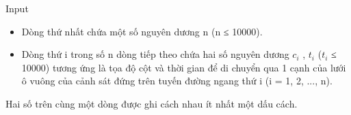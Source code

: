 Input
\begin{itemize}
	\item Dòng thứ nhất chứa một số nguyên dương n (n ≤ 10000).
	\item Dòng thứ i trong số n dòng tiếp theo chứa hai số nguyên dương $c_{i}$ , $t_{i}$ ($t_{i}$ ≤ 10000) tương ứng là tọa độ cột và thời gian để di chuyển qua 1 cạnh của lưới ô vuông của cảnh sát đứng trên tuyến đường ngang thứ i (i = 1, 2, ..., n).
\end{itemize}

Hai số trên cùng một dòng được ghi cách nhau ít nhất một dấu cách.